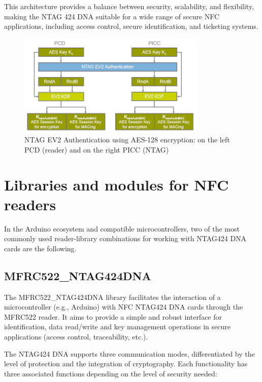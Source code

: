 This architecture provides a balance between security, scalability, and flexibility, making the NTAG 424 DNA suitable for a wide range of secure NFC applications, including access control, secure identification, and ticketing systems.

\begin{figure}[h!]
	\centering
	\includegraphics[width=0.8\textwidth]{imaxes/EV2ntag.png} %
	\caption{NTAG EV2 Authentication using AES-128 encryption: on the left PCD (reader) and on the right PICC (NTAG)}
	\label{fig:ntag424_ev2}
\end{figure}

\section{Libraries and modules for NFC readers}

In the Arduino ecosystem and compatible microcontrollers, two of the most commonly used reader-library combinations for working with NTAG424 DNA cards are the following.

\subsection{MFRC522\_NTAG424DNA}

The MFRC522\_NTAG424DNA library \cite{ref26} facilitates the interaction of a microcontroller (e.g., Arduino) with NFC NTAG424 DNA cards through the MFRC522 reader. It aims to provide a simple and robust interface for identification, data read/write and key management operations in secure applications (access control, traceability, etc.).

The NTAG424 DNA supports three communication modes, differentiated by the level of protection and the integration of cryptography. Each functionality has three associated functions depending on the level of security needed:

